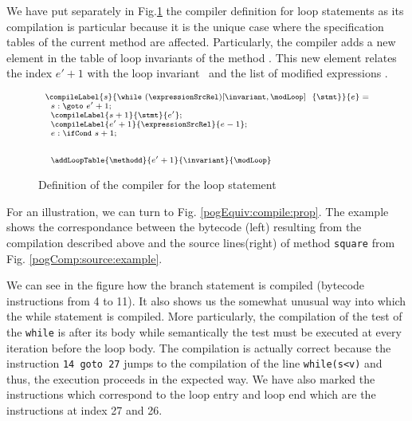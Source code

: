 We have put separately in Fig.\ref{pogEq:compile:compExpr:defLoop} the compiler definition for loop statements as its compilation is particular
 because it is the unique case where the specification tables of the current method are affected. 
Particularly, the compiler adds a new element in the table of loop invariants of the method \methodd. 
This new element relates  the index $e'+1$  with the loop invariant \invariant \  and the
 list of modified expressions \modLoop.
\begin{figure}[ht!]
\begin{frameit}
$${\scriptsize 
        \begin{array}{l}
 \compileLabel{s}{\while \ (\expressionSrcRel) \lbrack \invariant, \modLoop \rbrack \ \do \ \{ \stmt \} }{e} = \\
         \begin{array}{l}
              s: \goto \ e' + 1; \\
	      \compileLabel{s +  1}{\stmt}{e' }; \\
	      \compileLabel{e' +  1}{\expressionSrcRel}{e  -1 };\\
	      e: \ifCond \ s +  1; \\
	      \\\\
	      \addLoopTable{\methodd}{e'+1}{\invariant }{\modLoop}
	 \end{array}

\end{array} 
} $$

\caption{\sc Definition of the compiler for the loop statement}
\label{pogEq:compile:compExpr:defLoop}
\end{frameit}
\end{figure}



For an illustration, we can turn to Fig. \ref{pogEquiv:compile:prop}.
The example shows the correspondance between  the bytecode (left) resulting from the compilation described above and the source lines(right)
 of method  \lstinline!square! from Fig. \ref{pogComp:source:example}.

We can see in the figure how the branch statement is compiled (bytecode instructions from 4 to 11).
 It also shows us the somewhat unusual way into which 
the while statement is compiled. More particularly, the compilation of the test of the \lstinline!while! is after its body while semantically the test must be executed 
at every iteration before the loop body.  The compilation is actually correct because the instruction 
\lstinline!14 goto 27! jumps to the compilation of the line \lstinline!while(s<v)! and thus, the execution proceeds in the expected way.
 We have also marked the instructions which correspond to the loop entry and loop end  which are the instructions at index 27 and 26. 
 

